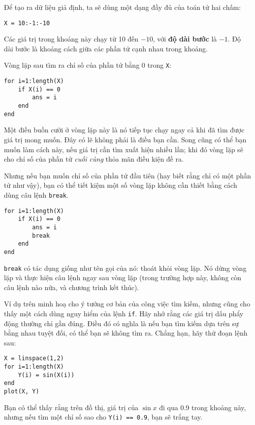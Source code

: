 \documentclass[12pt]{book}
\begin{document}
Để tạo ra dữ liệu giả định, ta sẽ dùng một dạng đầy đủ của 
toán tử hai chấm:

\begin{verbatim}
X = 10:-1:-10
\end{verbatim}

Các giá trị trong khoảng này chạy từ 10 đến $-10$, với 
{\bf độ dài bước} là $-1$. Độ dài bước là khoảng cách giữa các
phần tử cạnh nhau trong khoảng.

Vòng lặp sau tìm ra chỉ số của phần tử bằng 0 trong {\tt X}:

\begin{verbatim}
for i=1:length(X)
    if X(i) == 0
        ans = i
    end
end
\end{verbatim}

Một điều buồn cười ở vòng lặp này là nó tiếp tục chạy ngay cả khi
đã tìm được giá trị mong muốn. Đây có lẽ không phải là điều bạn
cần. Song cũng có thể bạn muốn làm cách này, nếu giá trị cần tìm
xuất hiện nhiều lần; khi đó vòng lặp sẽ cho chỉ số của phần tử
{\em cuối cùng} thỏa mãn điều kiện đề ra.

Nhưng nếu bạn muốn chỉ số của phần tử đầu tiên (hay biết rằng chỉ
có một phần tử như vậy), bạn có thể tiết kiệm một số vòng lặp 
không cần thiết bằng cách dùng câu lệnh {\tt break}.

\begin{verbatim}
for i=1:length(X)
    if X(i) == 0
        ans = i
        break
    end
end
\end{verbatim}

{\tt break} có tác dụng giống như tên gọi của nó: thoát khỏi
vòng lặp. Nó dừng vòng lặp và thực hiện câu lệnh ngay sau 
vòng lặp (trong trường hợp này, không còn câu lệnh nào nữa,
và chương trình kết thúc).

Ví dụ trên minh hoạ cho ý tưởng cơ bản của công việc tìm kiếm,
nhưng cũng cho thấy một cách dùng nguy hiểm của lệnh {\tt if}.
Hãy nhớ rằng các giá trị dấu phẩy động thường chỉ gần đúng. 
Điều đó có nghĩa là nếu bạn tìm kiếm dựa trên sự bằng nhau tuyệt
đối, có thể bạn sẽ không tìm ra. Chẳng hạn, hãy thử đoạn lệnh sau:

\begin{verbatim}
X = linspace(1,2)
for i=1:length(X)
    Y(i) = sin(X(i))
end
plot(X, Y)
\end{verbatim}

Bạn có thể thấy rằng trên đồ thị, giá trị của $\sin x$ đi qua
0.9 trong khoảng này, nhưng nếu tìm một chỉ số sao cho
{\tt Y(i) == 0.9}, bạn sẽ trắng tay.
\end{document}
